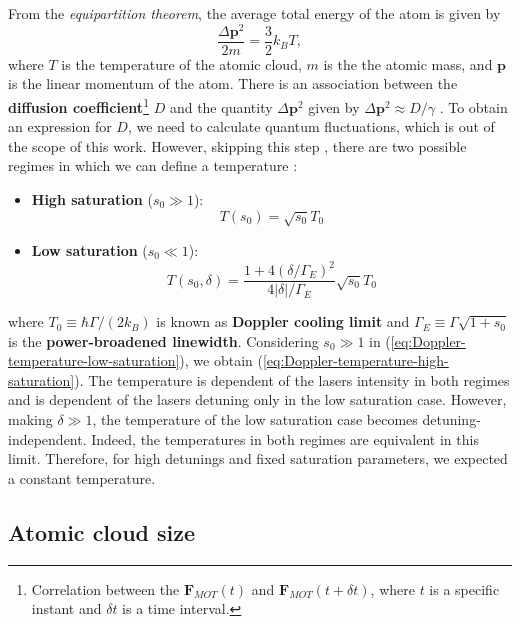 From the \textit{equipartition theorem}, the average total energy of the atom is given by
\begin{equation}
	\frac{\Delta \mathbf{p}^2}{2m} = \frac{3}{2} k_B T,
\end{equation}
where $ T $ is the temperature of the atomic cloud, $m$ is the the atomic mass, and $ \mathbf{p} $ is the linear momentum of the atom. There is an association between the \textbf{diffusion coefficient}\footnote{Correlation between the $\mathbf{F}_{MOT}(t) $ and $ \mathbf{F}_{MOT}(t + \delta t) $, where $ t $ is a specific instant and $ \delta t $ is a time interval.} $ D $ and the quantity $ \Delta \mathbf{p}^2 $ given by $ \Delta \mathbf{p}^2 \approx D / \gamma $ \cite[Section~2]{perrin2014doppler}. To obtain an expression for $ D $, we need to calculate quantum fluctuations, which is out of the scope of this work. However, skipping this step \cite[Section~2.3]{perrin2014doppler}, there are two possible regimes in which we can define a temperature \cite[Section~V]{loftus2004narrow}:
\begin{itemize}
	\item \textbf{High saturation} ($ s_0 \gg 1 $):
	\begin{equation}
		T(s_0) = \sqrt{s_0} T_0
		\label{eq:Doppler-temperature-high-saturation}
	\end{equation}
	\item \textbf{Low saturation} ($ s_0 \ll 1 $):
	\begin{equation}
		T(s_0, \delta) = \frac{1 + 4(\delta / \Gamma_E)^2}{4|\delta|/\Gamma_E} \sqrt{s_0} T_0
		\label{eq:Doppler-temperature-low-saturation}
	\end{equation}
\end{itemize}
where $ T_0 \equiv \hbar \Gamma / (2 k_B) $ is known as \textbf{Doppler cooling limit} and $ \Gamma_{E} \equiv \Gamma \sqrt{1 + s_0} $ is the \textbf{power-broadened linewidth}. Considering $ s_0 \gg 1 $ in (\ref{eq:Doppler-temperature-low-saturation}), we obtain (\ref{eq:Doppler-temperature-high-saturation}). The temperature is dependent of the lasers intensity in both regimes and is dependent of the lasers detuning only in the low saturation case. However, making $ \delta \gg 1 $, the temperature of the low saturation case becomes detuning-independent. Indeed, the temperatures in both regimes are equivalent in this limit. Therefore, for high detunings and fixed saturation parameters, we expected a constant temperature.

\subsection{Atomic cloud size}
\label{sec:MOT-cloud-size}
